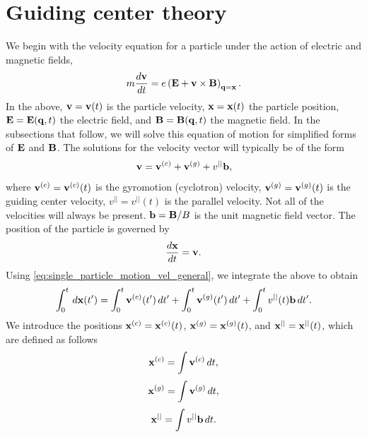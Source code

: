 \documentclass[a4paper,11pt]{report}
\begin{document}
\chapter{Guiding center theory}
We begin with the velocity equation for a particle under the action of electric and magnetic fields, 
\begin{equation}
\label{eq:single_particle_motion}
    m \frac{d \mathbf{v}}{dt} = e \left ( \mathbf{E} + \mathbf{v} \times \mathbf{B} \right )_{\mathbf{q} = \mathbf{x}}.
\end{equation}
In the above, $\mathbf{v} = \mathbf{v}(t)$ is the particle velocity, $\mathbf{x} = \mathbf{x}(t)$ the particle position, $\mathbf{E} = \mathbf{E}(\mathbf{q},t)$ the electric field, and $\mathbf{B} = \mathbf{B}(\mathbf{q},t)$ the magnetic field. In the subsections that follow, we will solve this equation of motion for simplified forms of $\mathbf{E}$ and $\mathbf{B}$. The solutions for the velocity vector will typically be of the form
\begin{equation}
    \label{eq:single_particle_motion_vel_general}
    \mathbf{v} = \mathbf{v}^{(c)} + \mathbf{v}^{(g)} + v^{||} \mathbf{b},
\end{equation}
where $\mathbf{v}^{(c)} = \mathbf{v}^{(c)}(t)$ is the gyromotion (cyclotron) velocity, $\mathbf{v}^{(g)} = \mathbf{v}^{(g)}(t)$ is the guiding center velocity, $v^{||} = v^{||}(t)$ is the parallel velocity. Not all of the velocities will always be present. $\mathbf{b} = \mathbf{B} / B$ is the unit magnetic field vector. The position of the particle is governed by 
\begin{equation}
    \frac{d\mathbf{x}}{dt} = \mathbf{v}.
\end{equation}
Using \cref{eq:single_particle_motion_vel_general}, we integrate the above to obtain
\begin{equation}
    \label{eq:single_particle_motion_pos_eq_mod}
    \int_0^t \, d\mathbf{x}(t') = \int_0^t \mathbf{v}^{(c)}(t') \, dt' + \int_0^t \mathbf{v}^{(g)}(t') \, dt' + \int_0^t v^{||}(t) \mathbf{b} \, dt'.
\end{equation}
We introduce the positions $\mathbf{x}^{(c)} = \mathbf{x}^{(c)}(t)$, $\mathbf{x}^{(g)} = \mathbf{x}^{(g)}(t)$, and $\mathbf{x}^{||} = \mathbf{x}^{||}(t)$, which are defined as follows
\begin{equation}
    \mathbf{x}^{(c)} = \int \mathbf{v}^{(c)} \, dt,
\end{equation}
\begin{equation}
    \mathbf{x}^{(g)} = \int \mathbf{v}^{(g)} \, dt,
\end{equation}
\begin{equation}
    \mathbf{x}^{||} = \int v^{||} \mathbf{b} \, dt.
\end{equation}
\end{document}
